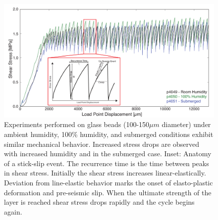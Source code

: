 \begin{figure}
\includegraphics[width=35pc]{chap_electrical/ss_humidity.pdf}
\caption{Experiments performed on glass beads (100-150$\mu m$ diameter) under ambient humidity, 100\% humidity, and submerged conditions exhibit similar mechanical behavior.  Increased stress drops are observed with increased humidity and in the submerged case.  Inset: Anatomy of a stick-slip event.  The recurrence time is the time between peaks in shear stress.  Initially the shear stress increases linear-elastically.  Deviation from line-elastic behavior marks the onset of elasto-plastic deformation and pre-seismic slip.  When the ultimate strength of the layer is reached shear stress drops rapidly and the cycle begins again.}
\label{ss_humidity}
\end{figure}

\clearpage

